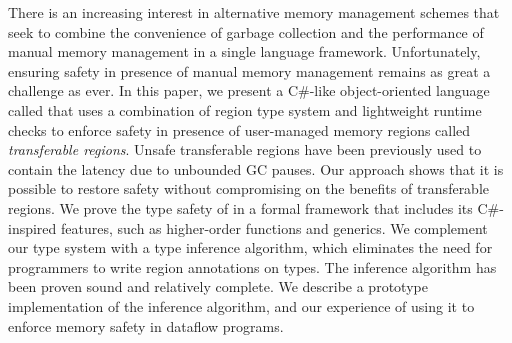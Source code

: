 There is an increasing interest in alternative memory management
schemes that seek to combine the convenience of garbage collection
and the performance of manual memory management in a single language
framework.  Unfortunately, ensuring safety in presence of manual
memory management remains as great a challenge as ever. In this paper,
we present a C\#-like object-oriented language called \name that uses
a combination of region type system and lightweight runtime checks to
enforce safety in presence of user-managed memory regions called
\emph{transferable regions}. Unsafe transferable regions have been
previously used to contain the latency due to unbounded GC pauses. Our
approach shows that it is possible to restore safety without
compromising on the benefits of transferable regions.  We prove the
type safety of \name in a formal framework that includes its
C\#-inspired features, such as higher-order functions and generics. We
complement our type system with a type inference algorithm, which
eliminates the need for programmers to write region annotations on
types. The inference algorithm has been proven sound and relatively
complete. We describe a prototype implementation of the inference
algorithm, and our experience of using it to enforce memory safety in
dataflow programs.

